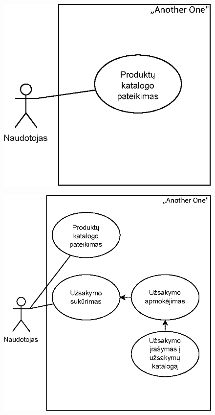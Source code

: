 \documentclass{VUMIFPSkursinis}
\begin{document}
\begin{figure}[H]
    \centering
    \includegraphics[scale=1]{img/ProductUseCase1}
\end{figure}
\begin{figure}[H]
    \centering
    \includegraphics[scale=1]{img/ProductUseCase2}
\end{figure}
\end{document}
